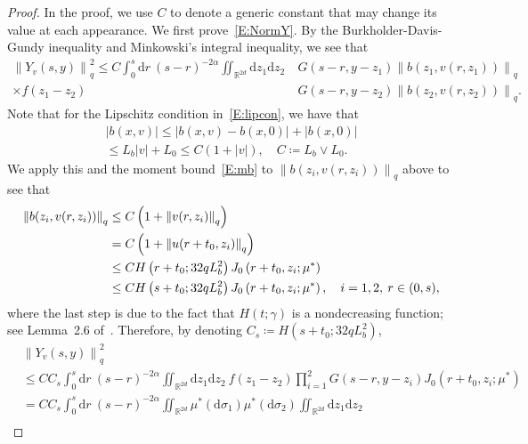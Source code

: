 \documentclass[sn-mathphys]{sn-jnl}%
\renewcommand{\R}{\mathbb{R}}
\newcommand{\Norm}[1]{\left\| #1 \right\|}
\newcommand{\ud}{\ensuremath{\mathrm{d}}}
\numberwithin{equation}{section}
\theoremstyle{thmstyleone}%
\theoremstyle{thmstyletwo}%
\theoremstyle{thmstylethree}%
\begin{document}
\begin{proof}
  In the proof, we use $C$ to denote a generic constant that may change its value at each
  appearance. We first prove~\eqref{E:NormY}. By the Burkholder-Davis-Gundy inequality and
  Minkowski's integral inequality, we see that
  \begin{align*}
    \Norm{Y_v(s,y)}_q^2 \le
    C \int_0^s \ud r \: (s-r)^{-2\alpha}
    \iint_{\R^{2d}} \ud z_1\ud z_2 \: & G(s-r,y-z_1) \Norm{b\left(z_1,v(r,z_1)\right)}_q \\
    \times f(z_1-z_2)                  & G(s-r,y-z_2) \Norm{b\left(z_2,v(r,z_2)\right)}_q.
  \end{align*}
  Note that for the Lipschitz condition in~\eqref{E:lipcon}, we have that
  \begin{gather*}
    \lvert b\left(x,v\right) \rvert
      \le \lvert b\left(x,v\right) - b\left(x,0\right)\rvert + \lvert b\left(x,0\right)\rvert \\
      \le L_b \lvert v \rvert + L_0 \le C (1+\lvert v \rvert),\quad C \coloneqq L_b\vee L_0.
  \end{gather*}
  We apply this and the moment bound~\eqref{E:mb} to $\Norm{b(z_i, v(r,z_i))}_q$ above to see that
  \begin{align}\label{E:NormB}
    \Norm{b(z_i, v(r,z_i))}_q
    & \le C\left(1+\Norm{v(r,z_i)}_q\right)                               \notag \\
    & =   C\left(1+\Norm{u(r+t_0,z_i)}_q\right)                           \notag \\
    & \le C H\left(r+t_0;32qL_b^2\right) J_0\left(r + t_0,z_i;\mu^*\right)\notag \\
    & \le C H\left(s+t_0;32qL_b^2\right) J_0\left(r + t_0,z_i;\mu^*\right), \quad i = 1,2, \: r\in(0,s),
  \end{align}
  where the last step is due to the fact that $H(t;\gamma)$ is a nondecreasing function; see
  Lemma~2.6 of~\cite{chen.kim:19:nonlinear}. Therefore, by denoting $C_s \coloneqq
  H\left(s+t_0;32qL_b^2\right)$,
  \begin{align*}
    & \Norm{Y_v(s,y)}_q^2                                                                                                                                                      \\
    & \le C C_s \int_0^s \ud r \: (s-r)^{-2\alpha} \iint_{\R^{2d}} \ud z_1\ud z_2\: f(z_1-z_2) \prod_{i = 1}^2 G(s-r,y-z_i) J_0\left(r + t_0,z_i;\mu^*\right)                  \\
    & = C C_s \int_0^s \ud r \: (s-r)^{-2\alpha} \iint_{\R^{2d}} \mu^* (\ud \sigma_1) \mu^* (\ud \sigma_2) \iint_{\R^{2d}} \ud z_1\ud z_2                                      \\

\end{align*}
\end{proof}
\end{document}
